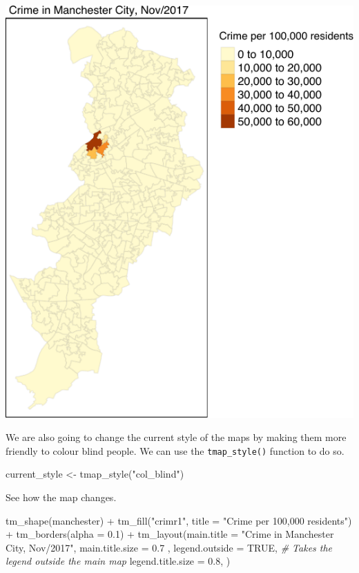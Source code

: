\documentclass[
  krantz2]{krantz}
\makeatletter
\newenvironment{Shaded}{\begin{snugshade}}{\end{snugshade}}
\newcommand{\AttributeTok}[1]{\textcolor[rgb]{0.61,0.61,0.61}{#1}}
\newcommand{\CommentTok}[1]{\textcolor[rgb]{0.37,0.37,0.37}{\textit{#1}}}
\newcommand{\ConstantTok}[1]{\textcolor[rgb]{0,0,0}{#1}}
\newcommand{\FloatTok}[1]{\textcolor[rgb]{0.06,0.06,0.06}{#1}}
\newcommand{\FunctionTok}[1]{\textcolor[rgb]{0,0,0}{#1}}
\newcommand{\NormalTok}[1]{#1}
\newcommand{\OtherTok}[1]{\textcolor[rgb]{0.37,0.37,0.37}{#1}}
\newcommand{\SpecialCharTok}[1]{\textcolor[rgb]{0,0,0}{#1}}
\newcommand{\StringTok}[1]{\textcolor[rgb]{0.5,0.5,0.5}{#1}}
\newenvironment{kframe}{%
\medskip{}
\setlength{\fboxsep}{.8em}
 \def\at@end@of@kframe{}%
 \ifinner\ifhmode%
  \def\at@end@of@kframe{\end{minipage}}%
  \begin{minipage}{\columnwidth}%
 \fi\fi%
 \def\FrameCommand##1{\hskip\@totalleftmargin \hskip-\fboxsep
 \colorbox{shadecolor}{##1}\hskip-\fboxsep
     \hskip-\linewidth \hskip-\@totalleftmargin \hskip\columnwidth}%
 \MakeFramed {\advance\hsize-\width
   \@totalleftmargin\z@ \linewidth\hsize
   \@setminipage}}%
 {\par\unskip\endMakeFramed%
 \at@end@of@kframe}
\renewenvironment{Shaded}{\begin{kframe}}{\end{kframe}}
\makeatother
\begin{document}
\includegraphics{crime_mapping_files/figure-latex/unnamed-chunk-87-1.pdf}

We are also going to change the current style of the maps by making them more friendly to colour blind people. We can use the \texttt{tmap\_style()} function to do so.

\begin{Shaded}
\begin{Highlighting}[]
\NormalTok{current\_style }\OtherTok{\textless{}{-}} \FunctionTok{tmap\_style}\NormalTok{(}\StringTok{"col\_blind"}\NormalTok{)}
\end{Highlighting}
\end{Shaded}

See how the map changes.

\begin{Shaded}
\begin{Highlighting}[]
\FunctionTok{tm\_shape}\NormalTok{(manchester) }\SpecialCharTok{+} 
  \FunctionTok{tm\_fill}\NormalTok{(}\StringTok{"crimr1"}\NormalTok{, }\AttributeTok{title =} \StringTok{"Crime per 100,000 residents"}\NormalTok{) }\SpecialCharTok{+}
  \FunctionTok{tm\_borders}\NormalTok{(}\AttributeTok{alpha =} \FloatTok{0.1}\NormalTok{) }\SpecialCharTok{+}
  \FunctionTok{tm\_layout}\NormalTok{(}\AttributeTok{main.title =} \StringTok{"Crime in Manchester City, Nov/2017"}\NormalTok{, }
            \AttributeTok{main.title.size =} \FloatTok{0.7}\NormalTok{ ,}
            \AttributeTok{legend.outside =} \ConstantTok{TRUE}\NormalTok{,  }\CommentTok{\# Takes the legend outside the main map }
            \AttributeTok{legend.title.size =} \FloatTok{0.8}\NormalTok{,}
\NormalTok{            )}
\end{Highlighting}
\end{Shaded}
\end{document}
